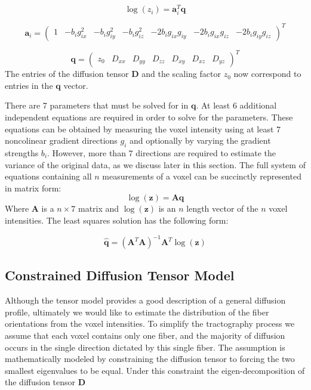 \begin{equation} \label{eq:logtensormodelexpanded}
\log(z_i)=\mathbf{a}_i^T\mathbf{q}
\end{equation}

\begin{equation} \label{eq:xi}
\mathbf{a}_i=
\left( \begin{array}{ccccccc}
1 & -b_ig_{ix}^2 & -b_ig_{iy}^2 & -b_ig_{iz}^2 & -2b_ig_{ix}g_{iy} & -2b_ig_{ix}g_{iz} & -2b_ig_{iy}g_{iz}
\end{array} \right)^T
\end{equation}


\begin{equation} \label{eq:q}
\mathbf{q}=
\left( \begin{array}{ccccccc}
z_0 & D_{xx} & D_{yy} & D_{zz} & D_{xy} & D_{xz} & D_{yz}
\end{array} \right)^T
\end{equation}
%
%
The entries of the diffusion tensor $\mathbf{D}$ and the scaling factor $z_0$ now correspond to entries in the $\mathbf{q}$ vector.

There are 7 parameters that must be solved for in $\mathbf{q}$.  At least 6 additional independent equations are required in order to solve for the parameters.  These equations can be obtained by measuring the voxel intensity using at least 7 noncolinear gradient directions $g_i$ and optionally by varying the gradient strengths $b_i$.  However, more than 7 directions are required to estimate the variance of the original data, as we discuss later in this section. The full system of equations containing all $n$ measurements of a voxel can be succinctly represented in matrix form:
\begin{equation} \label{eq:fulllogtensor}
\log(\mathbf{z})=\mathbf{A}\mathbf{q}
\end{equation}
Where $\mathbf{A}$ is a $n\times7$ matrix and $\log(\mathbf{z})$ is an $n$ length vector of the $n$ voxel intensities.  The least squares solution has the following form:

\begin{equation} \label{eq:LSUpsilon}
\hat{\mathbf{q}} = (\mathbf{A}^T\mathbf{A})^{-1}\mathbf{A}^T\log(\mathbf{z})
\end{equation}

\subsection{Constrained Diffusion Tensor Model}
Although the tensor model provides a good description of a general diffusion profile, ultimately we would like to estimate the distribution of the fiber orientations from the voxel intensities.  To simplify the tractography process we assume that each voxel contains only one fiber, and the majority of diffusion occurs in the single direction dictated by this single fiber.  The assumption is mathematically modeled by constraining the diffusion tensor to forcing the two smallest eigenvalues to be equal.  Under this constraint the eigen-decomposition of the diffusion tensor $\mathbf{D}$

